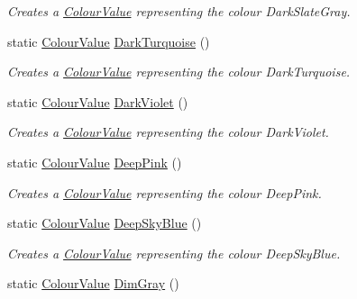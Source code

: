 \begin{DoxyCompactItemize}
\begin{DoxyCompactList}\small\item\em Creates a \hyperlink{classMezzanine_1_1ColourValue}{ColourValue} representing the colour DarkSlateGray. \item\end{DoxyCompactList}\item 
static \hyperlink{classMezzanine_1_1ColourValue}{ColourValue} \hyperlink{classMezzanine_1_1ColourValue_a804677141f55d1ef259f22b8becd1a56}{DarkTurquoise} ()
\begin{DoxyCompactList}\small\item\em Creates a \hyperlink{classMezzanine_1_1ColourValue}{ColourValue} representing the colour DarkTurquoise. \item\end{DoxyCompactList}\item 
static \hyperlink{classMezzanine_1_1ColourValue}{ColourValue} \hyperlink{classMezzanine_1_1ColourValue_a95df34bea55be13d2f94e29794d03044}{DarkViolet} ()
\begin{DoxyCompactList}\small\item\em Creates a \hyperlink{classMezzanine_1_1ColourValue}{ColourValue} representing the colour DarkViolet. \item\end{DoxyCompactList}\item 
static \hyperlink{classMezzanine_1_1ColourValue}{ColourValue} \hyperlink{classMezzanine_1_1ColourValue_a315df63b0a0f91446c9b0009a9124c44}{DeepPink} ()
\begin{DoxyCompactList}\small\item\em Creates a \hyperlink{classMezzanine_1_1ColourValue}{ColourValue} representing the colour DeepPink. \item\end{DoxyCompactList}\item 
static \hyperlink{classMezzanine_1_1ColourValue}{ColourValue} \hyperlink{classMezzanine_1_1ColourValue_ab3c722ce0a145d8ee135fedff57a7ea2}{DeepSkyBlue} ()
\begin{DoxyCompactList}\small\item\em Creates a \hyperlink{classMezzanine_1_1ColourValue}{ColourValue} representing the colour DeepSkyBlue. \item\end{DoxyCompactList}\item 
static \hyperlink{classMezzanine_1_1ColourValue}{ColourValue} \hyperlink{classMezzanine_1_1ColourValue_abfd1ff7b1c5ea50017f1882b3ee0b8a9}{DimGray} ()

\end{DoxyCompactItemize}
